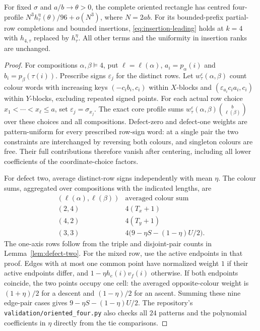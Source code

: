 \begin{lemma}\label{lem:oriented-leading}
For fixed $\sigma$ and $a/b\to\theta>0$, the complete oriented rectangle
has centred four-profile $N^3h^\eta_\tau(\theta)/96+o(N^3)$, where $N=2ab$.
For its bounded-prefix partial-row completions and bounded insertions,
\eqref{eq:insertion-leading} holds at $k=4$ with $h_{4,\tau}$ replaced by
$h^\eta_\tau$.  All other terms and the uniformity in insertion ranks are
unchanged.
\end{lemma}
\begin{proof}
For compositions $\alpha,\beta\vDash4$, put $\ell=\ell(\alpha)$,
$a_i=p_\alpha(i)$ and $b_i=p_\beta(\tau(i))$.  Prescribe signs $\varepsilon_j$ for the distinct
rows.  Let $w^\varepsilon_\tau(\alpha,\beta)$ count colour words with
increasing keys $(-c_ib_i,c_i)$ within $X$-blocks and
$(\varepsilon_{a_i}c_ia_i,c_i)$ within $Y$-blocks, excluding repeated
signed points.  For each actual row choice $x_1<\cdots<x_\ell\le a$, set
$\varepsilon_j=\sigma_{x_j}$.  The exact core profile sums
$w^\varepsilon_\tau(\alpha,\beta)\binom b{\ell(\beta)}$ over these choices
and all compositions.  Defect-zero and defect-one weights are pattern-uniform for
every prescribed row-sign word: at a single pair the two constraints are
interchanged by reversing both colours, and singleton colours are free.
Their full contributions therefore vanish after centering, including all
lower coefficients of the coordinate-choice factors.

For defect two, average distinct-row signs independently with mean $\eta$.
The colour sums, aggregated over compositions with the indicated lengths,
are
\[
\begin{array}{c|c}
(\ell(\alpha),\ell(\beta))&\text{averaged colour sum}\\\hline
(2,4)&4(T_x+1)\\
(4,2)&4(T_y+1)\\
(3,3)&4\bigl(9-\eta S-(1-\eta)U/2\bigr).
\end{array}
\]
The one-axis rows follow from the triple and disjoint-pair counts in
Lemma~\ref{lem:defect-two}.  For the mixed row, use the active endpoints in that proof.
Edges with at most one common point have normalized weight $1$ if their
active endpoints differ, and $1-\eta h_e(i)v_f(i)$ otherwise.
If both endpoints coincide, the two points occupy one cell: the averaged
opposite-colour weight is $(1+\eta)/2$ for a descent and $(1-\eta)/2$ for
an ascent.  Summing these nine edge-pair cases gives
$9-\eta S-(1-\eta)U/2$.  The repository's
\texttt{validation/oriented\_four.py} also checks all $24$ patterns and
the polynomial coefficients in $\eta$ directly from the tie comparisons.


\end{proof}
